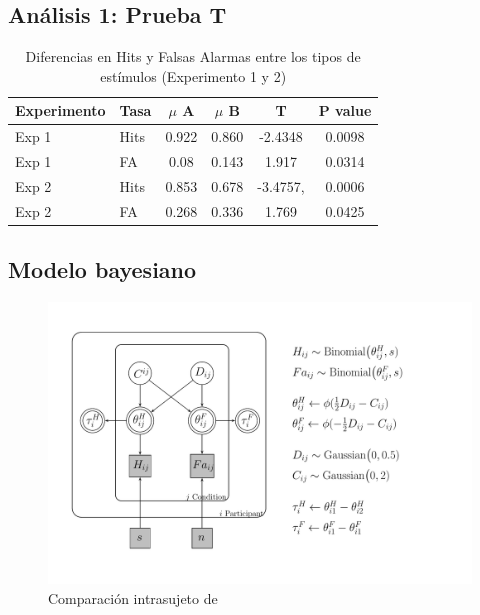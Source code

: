 \subsection{Análisis 1: Prueba T}



\begin{table}
\caption[Prueba T para evaluar diferencias en las medias de las tasas de ejecución (Hits y F. Alarmas) entre condiciones]{Diferencias en Hits y Falsas Alarmas entre los tipos de estímulos (Experimento 1 y 2)}
\label{Tabla_t-HitsyFA}
\centering
\begin{tabular}{l l | c c c c}
\toprule
\textbf{Experimento} & \textbf{Tasa} & \textbf{$\mu$ A} & \textbf{$\mu$ B} & \textbf{T} & \textbf{P value}\\
\midrule
Exp 1 & Hits & 0.922 & 0.860 & -2.4348 & 0.0098 \\
Exp 1 & FA & 0.08 & 0.143 & 1.917 & 0.0314 \\
Exp 2 & Hits & 0.853 & 0.678 & -3.4757, & 0.0006 \\
Exp 2 & FA & 0.268 & 0.336 & 1.769 & 0.0425 \\
\bottomrule
\end{tabular}
\end{table}


\subsection{Modelo bayesiano}


\begin{figure}[th]
\centering
\includegraphics[width=1.1\textwidth]{Figures/Model_Tau_Diff_Tetas}
\caption[Modelo Tau: Modelo Bayesiano para evaluar las diferencias entre las tasas de hits y falsas alarmas]{Comparación intrasujeto de}
\label{fig:Mod_Tau}
\end{figure}














